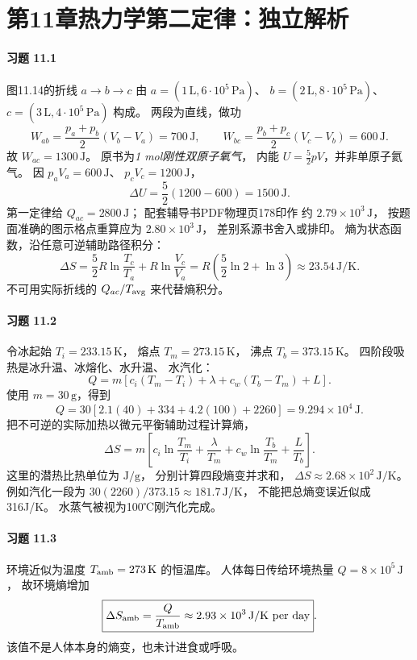 \section*{第11章\quad 热力学第二定律：独立解析}

\paragraph{习题 11.1}
图11.14的折线 \(a\to b\to c\) 由
\(a=(1\,\mathrm L,6\cdot10^5\,\mathrm{Pa})\)、
\(b=(2\,\mathrm L,8\cdot10^5\,\mathrm{Pa})\)、
\(c=(3\,\mathrm L,4\cdot10^5\,\mathrm{Pa})\) 构成。
两段为直线，做功
\[
 W_{ab}=\frac{p_a+p_b}{2}(V_b-V_a)=700\,\mathrm J,
 \qquad W_{bc}=\frac{p_b+p_c}{2}(V_c-V_b)=600\,\mathrm J.
\]
故 \(\boxed{W_{ac}=1300\,\mathrm J}\)。
原书为\emph{1 mol刚性双原子氧气}，
内能 \(U=\tfrac52pV\)，并非单原子氦气。
因 \(p_aV_a=600\,\mathrm J\)、
\(p_cV_c=1200\,\mathrm J\)，
\[
 \boxed{\Delta U=\frac52(1200-600)
 =1500\,\mathrm J}.
\]
第一定律给
\(\boxed{Q_{ac}=2800\,\mathrm J}\)；
配套辅导书PDF物理页178印作
约 \(2.79\times10^3\,\mathrm J\)，
按题面准确的图示格点重算应为
\(2.80\times10^3\,\mathrm J\)，
差别系源书舍入或排印。
熵为状态函数，沿任意可逆辅助路径积分：
\[
 \boxed{\Delta S
 =\frac52R\ln\frac{T_c}{T_a}+R\ln\frac{V_c}{V_a}
 =R\left(\frac52\ln2+\ln3\right)
 \approx23.54\,\mathrm{J/K}}.
\]
不可用实际折线的 \(Q_{ac}/T_{\rm avg}\)
来代替熵积分。

\paragraph{习题 11.2}
令冰起始 \(T_i=233.15\,\mathrm K\)，
熔点 \(T_m=273.15\,\mathrm K\)，
沸点 \(T_b=373.15\,\mathrm K\)。
四阶段吸热是冰升温、冰熔化、水升温、
水汽化：
\[
 \boxed{Q=m[c_i(T_m-T_i)+\lambda
 +c_w(T_b-T_m)+L]}.
\]
使用 \(m=30\,\mathrm g\)，得到
\[
 Q=30[2.1(40)+334+4.2(100)+2260]
 =\boxed{9.294\times10^4\,\mathrm J}.
\]
把不可逆的实际加热以微元平衡辅助过程计算熵，
\[
 \boxed{\Delta S
 =m\left[c_i\ln\frac{T_m}{T_i}
 +\frac{\lambda}{T_m}
 +c_w\ln\frac{T_b}{T_m}
 +\frac L{T_b}\right]}.
\]
这里的潜热比热单位为 \(\mathrm{J/g}\)，
分别计算四段熵变并求和，
\(\boxed{\Delta S\approx2.68\times10^2\,\mathrm{J/K}}\)。
例如汽化一段为
\(30(2260)/373.15\approx181.7\,\mathrm{J/K}\)，
不能把总熵变误近似成316J/K。
水蒸气被视为100℃刚汽化完成。

\paragraph{习题 11.3}
环境近似为温度
\(T_{\rm amb}=273\,\mathrm K\) 的恒温库。
人体每日传给环境热量
\(Q=8\times10^5\,\mathrm J\)，
故环境熵增加
\[
 \boxed{\Delta S_{\rm amb}=\frac Q{T_{\rm amb}}
 \approx2.93\times10^3\,\mathrm{J/K\ per\ day}}.
\]
该值不是人体本身的熵变，也未计进食或呼吸。

